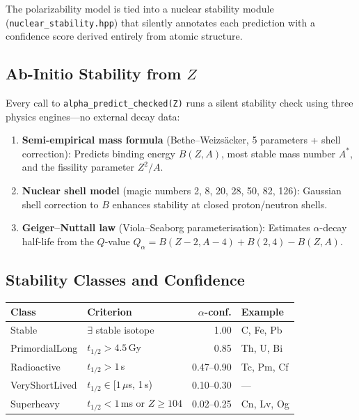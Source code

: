 \documentclass[11pt,letterpaper]{article}
\begin{document}
The polarizability model is tied into a nuclear stability module
(\texttt{nuclear\_stability.hpp}) that silently annotates each prediction
with a confidence score derived entirely from atomic structure.

\subsection{Ab-Initio Stability from $Z$}

Every call to \texttt{alpha\_predict\_checked(Z)} runs a silent stability
check using three physics engines—no external decay data:

\begin{enumerate}
\item \textbf{Semi-empirical mass formula} (Bethe--Weizs\"acker, 5
  parameters + shell correction):  Predicts binding energy $B(Z,A)$,
  most stable mass number $A^*$, and the fissility parameter $Z^2/A$.

\item \textbf{Nuclear shell model} (magic numbers 2, 8, 20, 28, 50, 82,
  126):  Gaussian shell correction to $B$ enhances stability at closed
  proton/neutron shells.

\item \textbf{Geiger--Nuttall law} (Viola--Seaborg parameterisation):
  Estimates $\alpha$-decay half-life from the $Q$-value
  $Q_\alpha = B(Z{-}2,A{-}4) + B(2,4) - B(Z,A)$.
\end{enumerate}

\subsection{Stability Classes and Confidence}

\begin{center}
\begin{tabular}{llrl}
\toprule
\textbf{Class} & \textbf{Criterion} & \textbf{$\alpha$-conf.} & \textbf{Example} \\
\midrule
Stable          & $\exists$ stable isotope & 1.00  & C, Fe, Pb \\
PrimordialLong  & $t_{1/2} > 4.5$\,Gy      & 0.85  & Th, U, Bi \\
Radioactive     & $t_{1/2} > 1$\,s          & 0.47--0.90 & Tc, Pm, Cf \\
VeryShortLived  & $t_{1/2} \in [1\,\mu$s, 1\,s) & 0.10--0.30 & --- \\
Superheavy      & $t_{1/2} < 1$\,ms or $Z \geq 104$ & 0.02--0.25 & Cn, Lv, Og \\
\bottomrule
\end{tabular}
\end{center}
\end{document}
